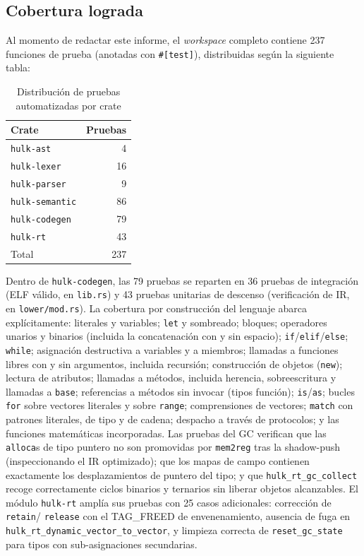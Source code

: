 \documentclass[12pt, a4paper]{article}
\begin{document}
\subsection{Cobertura lograda}

Al momento de redactar este informe, el \textit{workspace} completo contiene
237 funciones de prueba (anotadas con \texttt{\#[test]}), distribuidas según 
la siguiente tabla:

\begin{table}[h!]
\centering
\caption{Distribución de pruebas automatizadas por crate}
\label{tab:test-counts}
\begin{tabular}{@{}l r@{}}
\toprule
\textbf{Crate} & \textbf{Pruebas} \\
\midrule
\texttt{hulk-ast}      &  4  \\
\texttt{hulk-lexer}    & 16  \\
\texttt{hulk-parser}   &  9  \\
\texttt{hulk-semantic} & 86  \\
\texttt{hulk-codegen}  & 79  \\
\texttt{hulk-rt}       & 43  \\
\midrule
Total & 237 \\
\bottomrule
\end{tabular}
\end{table}

Dentro de \texttt{hulk-codegen}, las 79 pruebas se reparten en 36 pruebas de
integración (ELF válido, en \texttt{lib.rs}) y 43 pruebas unitarias de
descenso (verificación de IR, en \texttt{lower/mod.rs}). La cobertura por
construcción del lenguaje abarca explícitamente: literales y variables;
\texttt{let} y sombreado; bloques; operadores unarios y binarios (incluida la
concatenación con y sin espacio); \texttt{if}/\texttt{elif}/\texttt{else};
\texttt{while}; asignación destructiva a variables y a miembros; llamadas a
funciones libres con y sin argumentos, incluida recursión; construcción de
objetos (\texttt{new}); lectura de atributos; llamadas a métodos, incluida
herencia, sobreescritura y llamadas a \texttt{base}; referencias a métodos sin
invocar (tipos función); \texttt{is}/\texttt{as}; bucles \texttt{for} sobre
vectores literales y sobre \texttt{range}; comprensiones de vectores;
\texttt{match} con patrones literales, de tipo y de cadena; despacho a través
de protocolos; y las funciones matemáticas incorporadas. Las pruebas del
GC verifican que las \texttt{alloca}s de tipo puntero no son promovidas por
\texttt{mem2reg} tras la shadow-push (inspeccionando el IR optimizado); que los
mapas de campo contienen exactamente los desplazamientos de puntero del tipo; y
que \texttt{hulk\_rt\_gc\_collect} recoge correctamente ciclos binarios y
ternarios sin liberar objetos alcanzables. El módulo \texttt{hulk-rt} amplía
sus pruebas con 25 casos adicionales: corrección de \texttt{retain}/
\texttt{release} con el TAG\_FREED de envenenamiento, ausencia de fuga en
\texttt{hulk\_rt\_dynamic\_vector\_to\_vector}, y limpieza correcta de
\texttt{reset\_gc\_state} para tipos con sub-asignaciones secundarias.
\end{document}
